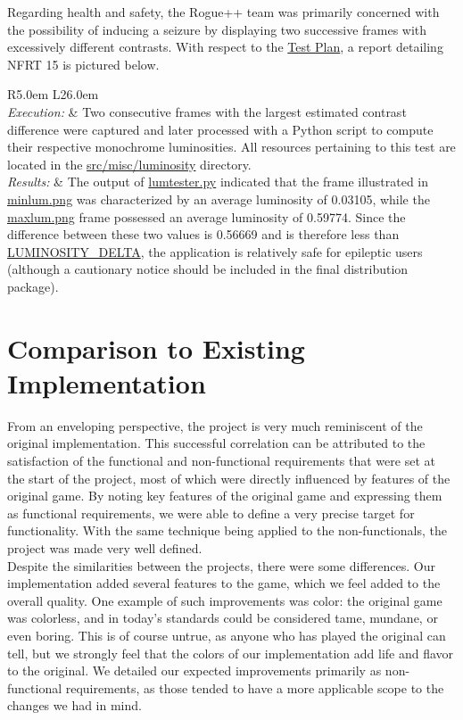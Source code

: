 \documentclass[12pt, titlepage]{article}
\newcommand{\newsection}[1]{\newpage\section{#1}}
\newcommand{\nfrtc}[3]{
	\begin{table}[H]
		\centering
		\def\arraystretch{1.6}
		\begin{tabular}{ R{5.0em} L{26.0em} }
			\bottomrule
			\multicolumn{2}{ c }{\textbf{Non-Functional Requirement Test} \# #1 \textbf{Report}}  \\
			\hline
			\textit{Execution:} & #2 \\
			\textit{Results:} & #3 \\
			\toprule
		\end{tabular}
	\end{table}
}
\newcommand{\tplink}[1]{\href{run:../TestPlan/TestPlan.pdf}{#1}}
\begin{document}
		Regarding health and safety, the Rogue++ team was primarily concerned with the possibility of inducing a seizure by displaying two successive frames with excessively different contrasts.  With respect to the \href{run:../TestPlan/TestPlan.pdf}{Test Plan}, a report detailing NFRT 15 is pictured below.

	\nfrtc {15}
			{Two consecutive frames with the largest estimated contrast difference were captured and later processed with a Python script to compute their respective monochrome luminosities.  All resources pertaining to this test are located in the \href{run:../../src/misc/luminosity}{src/misc/luminosity} directory.}
			{The output of \href{run:../../src/misc/luminosity/lumtester.py}{lumtester.py} indicated that the frame illustrated in \href{run:../../src/misc/luminosity/minlum.png}{minlum.png} was characterized by an average luminosity of 0.03105, while the \href{run:../../src/misc/luminosity/maxlum.png}{maxlum.png} frame possessed an average luminosity of 0.59774.  Since the difference between these two values is 0.56669 and is therefore less than \tplink{LUMINOSITY\_DELTA}, the application is relatively safe for epileptic users (although a cautionary notice should be included in the final distribution package).}

\newsection{Comparison to Existing Implementation} \label{Section_Comparison}

	From an enveloping perspective, the project is very much reminiscent of the original implementation. This successful correlation can be attributed to the satisfaction of the functional and non-functional requirements that were set at the start of the project, most of which were directly influenced by features of the original game. By noting key features of the original game and expressing them as functional requirements, we were able to define a very precise target for functionality. With the same technique being applied to the non-functionals, the project was made very well defined.\\

	Despite the similarities between the projects, there were some differences. Our implementation added several features to the game, which we feel added to the overall quality. One example of such improvements was color: the original game was colorless, and in today's standards could be considered tame, mundane, or even boring. This is of course untrue, as anyone who has played the original can tell, but we strongly feel that the colors of our implementation add life and flavor to the original. We detailed our expected improvements primarily as non-functional requirements, as those tended to have a more applicable scope to the changes we had in mind.\\
\end{document}
